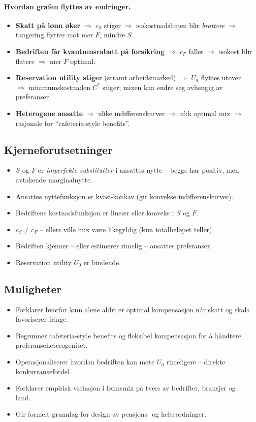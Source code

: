 \paragraph{Hvordan grafen flyttes av endringer.}
\begin{itemize}
\item \textbf{Skatt på lønn øker} $\Rightarrow$ $c_S$ stiger $\Rightarrow$ isokostnadslinjen blir \emph{brattere} $\Rightarrow$ tangering flytter mot mer $F$, mindre $S$.
\item \textbf{Bedriften får kvantumsrabatt på forsikring} $\Rightarrow$ $c_F$ faller $\Rightarrow$ isokost blir flatere $\Rightarrow$ mer $F$ optimal.
\item \textbf{Reservation utility stiger} (stramt arbeidsmarked) $\Rightarrow$ $U_0$ flyttes utover $\Rightarrow$ minimumskostnaden $C^*$ stiger; mixen kan endre seg avhengig av preferanser.
\item \textbf{Heterogene ansatte} $\Rightarrow$ ulike indifferenskurver $\Rightarrow$ ulik optimal mix $\Rightarrow$ rasjonale for ``cafeteria-style benefits''.
\end{itemize}

\subsection*{Kjerneforutsetninger}
\begin{itemize}
\item $S$ og $F$ er \emph{imperfekte substitutter} i ansattes nytte -- begge har positiv, men avtakende marginalnytte.
\item Ansattes nyttefunksjon er kvasi-konkav (gir konvekse indifferenskurver).
\item Bedriftens kostnadsfunksjon er lineær eller konveks i $S$ og $F$.
\item $c_S \neq c_F$ -- ellers ville mix være likegyldig (kun totalbeløpet teller).
\item Bedriften kjenner -- eller estimerer rimelig -- ansattes preferanser.
\item Reservation utility $U_0$ er bindende.
\end{itemize}

\subsection*{Muligheter}
\begin{itemize}
\item Forklarer hvorfor lønn alene aldri er optimal kompensasjon når skatt og skala favoriserer fringe.
\item Begrunner cafeteria-style benefits og fleksibel kompensasjon for å håndtere preferanseheterogenitet.
\item Operasjonaliserer hvordan bedriften kan møte $U_0$ rimeligere -- direkte konkurransefordel.
\item Forklarer empirisk variasjon i lønnsmix på tvers av bedrifter, bransjer og land.
\item Gir formelt grunnlag for design av pensjons- og helseordninger.
\end{itemize}

